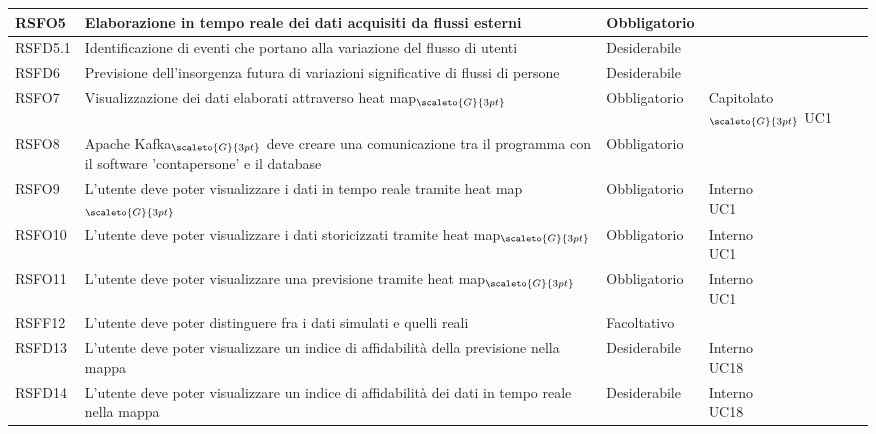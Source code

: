 {\begin{center}
\begin{longtable}{|p{2.5cm}|p{4.5cm}|p{3.5cm}|p{4cm}|}
			\hline
			\centering RSFO5 & Elaborazione in tempo reale dei dati acquisiti da flussi esterni &\centering  Obbligatorio & \makecell[tc]{Capitolato$_{\scaleto{G}{3pt}}$}  \\
			\hline
			\centering RSFD5.1 & Identificazione di eventi che portano alla variazione del flusso di utenti &\centering  Desiderabile & \makecell[tc]{Capitolato$_{\scaleto{G}{3pt}}$}  \\
			\hline
			\centering RSFD6 & Previsione dell'insorgenza futura di variazioni significative di flussi di persone & \centering Desiderabile & \makecell[tc]{Capitolato$_{\scaleto{G}{3pt}}$ }  \\
			\hline
			\centering RSFO7 & Visualizzazione dei dati elaborati attraverso heat map$_{\scaleto{G}{3pt}}$ &\centering  Obbligatorio & \makecell[tc]{Capitolato$_{\scaleto{G}{3pt}}$ \\ UC1}  \\
			\hline
			\centering RSFO8 & Apache Kafka$_{\scaleto{G}{3pt}}$ deve creare una comunicazione tra il programma con il software 'contapersone' e il database  &\centering  Obbligatorio &  \makecell[tc]{Interno} 	\\
			\hline
			\centering RSFO9 & L'utente deve poter visualizzare i dati in tempo reale tramite heat map$_{\scaleto{G}{3pt}}$  &\centering  Obbligatorio &  \makecell[tc]{Interno \\ UC1} 	\\
			\hline
			\centering RSFO10 & L'utente deve poter visualizzare i dati storicizzati tramite heat map$_{\scaleto{G}{3pt}}$  &\centering  Obbligatorio &  \makecell[tc]{Interno \\ UC1} 	\\
			\hline
			\centering RSFO11 & L'utente deve poter visualizzare una previsione tramite heat map$_{\scaleto{G}{3pt}}$  &\centering  Obbligatorio &  \makecell[tc]{Interno \\ UC1} 	\\
			\hline
			\centering RSFF12 & L'utente deve poter distinguere fra i dati simulati e quelli reali  &\centering  Facoltativo &  \makecell[tc]{Interno} 	\\
			\hline
			\centering RSFD13 & L'utente deve poter visualizzare un indice di affidabilità della previsione nella mappa  &\centering  Desiderabile &  \makecell[tc]{Interno \\ UC18} 	\\
			\hline
			\centering RSFD14 & L'utente deve poter visualizzare un indice di affidabilità dei dati in tempo reale nella mappa  &\centering  Desiderabile &  \makecell[tc]{Interno \\ UC18} 	\\

\end{longtable}
\end{center}}
